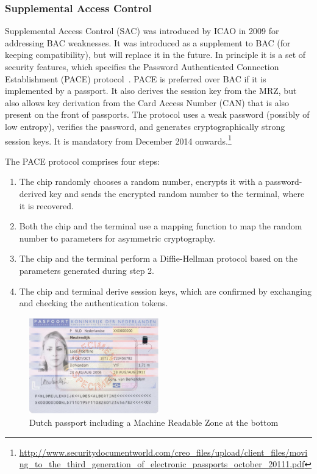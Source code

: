 \subsubsection{Supplemental Access Control}
Supplemental Access Control (SAC) was introduced by ICAO in 2009 for addressing BAC weaknesses. It was introduced as a supplement to BAC (for keeping compatibility), but will replace it in the future. In principle it is a set of security features, which specifies the Password Authenticated Connection Establishment (PACE) protocol~\cite{icao}. PACE is preferred over BAC if it is implemented by a passport. It also derives the session key from the MRZ, but also allows key derivation from the Card Access Number (CAN) that is also present on the front of passports. The protocol uses a weak password (possibly of low entropy), verifies the password, and generates cryptographically strong session keys. It is mandatory from December 2014 onwards.\footnote{\url{http://www.securitydocumentworld.com/creo_files/upload/client_files/moving_to_the_third_generation_of_electronic_passports_october_20111.pdf}}

The PACE protocol comprises four steps:
\begin{enumerate}
	\item The chip randomly chooses a random number, encrypts it with a password-derived key and sends the encrypted random number to the terminal, where it is recovered.
  \item Both the chip and the terminal use a mapping function to map the random number to parameters for asymmetric cryptography. 
  \item The chip and the terminal perform a Diffie-Hellman protocol based on the parameters generated during step 2. 
  \item The chip and terminal derive session keys, which are confirmed by exchanging and checking the authentication tokens.
\end{enumerate}

\begin{figure}[htb]
	\centering
		\includegraphics[width=0.50\textwidth]{images/dutchpassport.png}
	\caption{Dutch passport including a Machine Readable Zone at the bottom}
	\label{fig:dutchpassport}
\end{figure}

